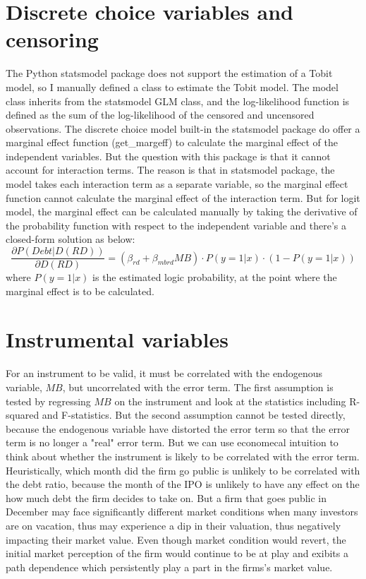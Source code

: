 \documentclass[12pt, times]{article}
\begin{document}
\section*{Discrete choice variables and censoring}

The Python statsmodel package does not support the estimation of a Tobit model, so I manually defined a class to estimate the Tobit model.
The model class inherits from the statsmodel GLM class, and the log-likelihood function is defined as the sum of the log-likelihood of the
censored and uncensored observations. 
The discrete choice model built-in the statsmodel package do offer a marginal effect function (get\_margeff) to calculate the
marginal effect of the independent variables. But the question with this package is that it cannot account for interaction terms.
The reason is that in statsmodel package, the model takes each interaction term as a separate variable, so the marginal effect
function cannot calculate the marginal effect of the interaction term. But for logit model, the marginal effect can be calculated
manually by taking the derivative of the probability function with respect to the independent variable and there's a closed-form solution as below:
\begin{equation}
    \frac{\partial P(Debt|D(RD))}{\partial D(RD)} = (\beta_{rd} + \beta_{mbrd} MB ) \cdot P(y=1|x) \cdot (1-P(y=1|x))
\end{equation}
where $P(y=1|x)$ is the estimated logic probability, at the point where the marginal effect is to be calculated. 


\section*{Instrumental variables}
For an instrument to be valid, it must be correlated with the endogenous variable, $MB$, 
but uncorrelated with the error term. The first assumption is tested by regressing $MB$ on the instrument and look at the statistics
including R-squared and F-statistics. But the second assumption cannot be tested directly, because the endogenous variable 
have distorted the error term so that the error term is no longer a "real" error term.
But we can use economecal intuition to think about whether the instrument is likely to be correlated with the error term.
Heuristically, which month did the firm go public is unlikely to be correlated with the debt ratio, because the month of the IPO
is unlikely to have any effect on the how much debt the firm decides to take on.
But a firm that goes public in December may face significantly different market conditions
when many investors are on vacation, thus may experience a dip in their valuation, thus negatively impacting
their market value. Even though market condition would revert, the initial market perception of the firm
would continue to be at play and exibits a path dependence which persistently play a part in the firms's market value.
\end{document}
